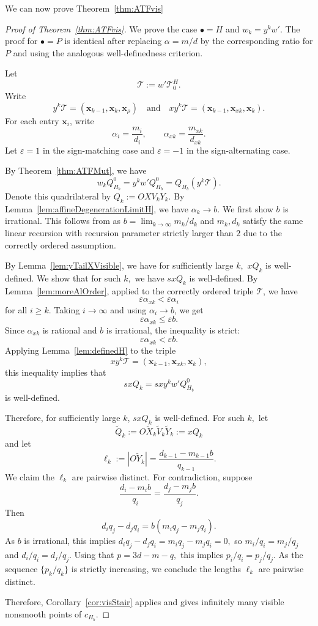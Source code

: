 \documentclass[11pt, reqno]{amsart}
\theoremstyle{remark}
\numberwithin{equation}{subsection}
\numberwithin{figure}{section}
\theoremstyle{customremark}
\newcommand{\Tt}{\mathcal{T}}
\newcommand{\al}{{\alpha}}
\newcommand{\eps}{\varepsilon}
\begin{document}
We can now prove Theorem~\ref{thm:ATFvis}
\begin{proof}[Proof of Theorem~\ref{thm:ATFvis}]
We prove the case $\bullet=H$ and $w_k=y^kw'$. The proof for $\bullet=P$
is identical after replacing $\alpha=m/d$ by the corresponding ratio for
$P$ and using the analogous well-definedness criterion. 

Let
\[
        \Tt:=w'\Tt_0^H.
\]
Write
\[
        y^k\Tt=(\bm{x}_{k-1},\bm{x}_k,\bm{x}_\rho) \quad \text{and} \quad  xy^k\Tt=(\bm{x}_{k-1},\bm{x}_{xk},\bm{x}_k).
\]
For each entry $\bm{x}_i$, write
\[
        \alpha_i=\frac{m_i}{d_i},
        \qquad
        \alpha_{xk}=\frac{m_{xk}}{d_{xk}}.
\]
Let $\eps=1$ in the sign-matching case and $\eps=-1$ in the
sign-alternating case.

By Theorem~\ref{thm:ATFMut}, we have
\[
        w_kQ_{H_b}^0
        =
        y^kw'Q_{H_b}^0
        =
        Q_{H_b}(y^k\Tt).
\]
Denote this quadrilateral by $Q_k:=OXV_kY_k.$ By Lemma~\ref{lem:affineDegenerationLimitH}, we have $\al_k \to b.$ We first show $b$ is irrational. This follows from \cite[Lemma 3.1.4]{MM} as $b=\lim_{k \to \infty}m_k/d_k$ and $m_k,d_k$ satisfy the same linear recursion with recursion parameter strictly larger than $2$ due to the correctly ordered assumption.

By Lemma~\ref{lem:yTailXVisible}, we have for sufficiently large $k,$ $xQ_k$ is well-defined. We show that for such $k,$ we have $sxQ_k$ is well-defined. By Lemma~\ref{lem:moreAlOrder}, applied to the correctly
ordered triple $\Tt$, we have
\[
        \eps\alpha_{xk}<\eps\alpha_i
\]
for all $i\geq k$. Taking $i\to\infty$ and using $\alpha_i\to b$, we get
\[
        \eps\alpha_{xk}\leq \eps b.
\]
Since $\alpha_{xk}$ is rational and $b$ is irrational, the inequality is
strict:
\[
        \eps\alpha_{xk}<\eps b.
\]
Applying Lemma~\ref{lem:definedH} to the triple
\[
        xy^k\Tt=(\bm{x}_{k-1},\bm{x}_{xk},\bm{x}_k),
\]
this inequality implies that
\[
        sxQ_k=sxy^kw'Q_{H_b}^0
\]
is well-defined.

Therefore, for sufficiently large $k$,
$sxQ_k$ is well-defined. For such $k,$ let \[\tilde{Q}_k:=O\tilde{X}_k\tilde{V}_k\tilde{Y}_k:=xQ_k\] and let \[\ell_k:=|O\tilde{Y}_k|=\frac{d_{k-1}-m_{k-1}b}{q_{k-1}}.\]
We claim the $\ell_k$ are pairwise distinct.
For contradiction, suppose \[
        \frac{d_i-m_i b}{q_i}
        =
        \frac{d_j-m_j b}{q_j}.
\]
Then
\[
        d_iq_j-d_jq_i
        =
        b(m_iq_j-m_jq_i).
\]
As $b$ is irrational, this implies $d_iq_j-d_jq_i=m_iq_j-m_jq_i=0,$ so $m_i/q_i=m_j/q_j$ and $d_i/q_i=d_j/q_j$. Using that $p=3d-m-q,$ this implies $p_i/q_i=p_j/q_j$. As the sequence $\{p_k/q_k\}$ is strictly increasing, we conclude the lengths $\ell_k$ are pairwise distinct.

Therefore, 
Corollary~\ref{cor:visStair} applies and gives infinitely many visible
nonsmooth points of $c_{H_b}$.
\end{proof}
\end{document}
